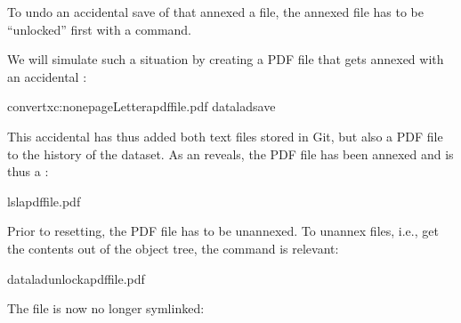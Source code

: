 \sphinxAtStartPar
To undo an accidental save of that annexed a file, the annexed file
has to be “unlocked” first with a  command.

\sphinxAtStartPar
We will simulate such a situation by creating a PDF file that
gets annexed with an accidental :

\begin{sphinxVerbatim}[commandchars=\\\{\}]
convertxc:none\PYGZhy{}pageLetterapdffile.pdf
dataladsave
\end{sphinxVerbatim}

\sphinxAtStartPar
This accidental  has thus added both text files
stored in Git, but also a PDF file to the history of the dataset.
As an  reveals, the PDF file has been annexed and is
thus a {\hyperref[\detokenize{glossary:term-symlink}]{}}:

\begin{sphinxVerbatim}[commandchars=\\\{\}]
ls\PYGZhy{}lapdffile.pdf
\end{sphinxVerbatim}

\sphinxAtStartPar
Prior to resetting, the PDF file has to be unannexed.
To unannex files, i.e., get the contents out of the object tree,
the  command is relevant:

\begin{sphinxVerbatim}[commandchars=\\\{\}]
dataladunlockapdffile.pdf
\end{sphinxVerbatim}

\sphinxAtStartPar
The file is now no longer symlinked:

